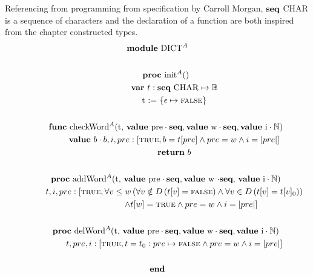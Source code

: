 \documentclass[a4paper,10pt,fleqn]{scrartcl}   	%
\newcommand{\seq}{\pPkey{seq}}
\newcommand{\Module}{\pPkey{module}}
\newcommand{\End}{\pPkey{end}}
\begin{document}
\\ \\
Referencing from programming from specification by Carroll Morgan, $\seq$ CHAR is a sequence of characters and the declaration of a function are both inspired from the chapter constructed types.
\begin{gather*}
\Module \text{ DICT$^A$}\\ \\
\qquad \PROC \text{ init$^A()$}\\
\qquad \qquad \VAR \text{ $t$} : \seq \text{ CHAR} \mapsto \bool \\
\qquad \qquad \text{t := } \{ \epsilon \mapsto \False \} \\ \\
\qquad \FUNC \text{ checkWord$^A$(t, } \VALUE \text{ pre} \cdot{\seq }, \VALUE \text{ w} \cdot{\seq }, \VALUE \text{ i} \cdot{\nat}) \\
\qquad\qquad \VALUE \text{ $b$} \cdot{} b, i, pre:[\True, b=t[pre] \And pre = w \And i=|pre|] \\
\qquad\qquad \RETURN \text{ $b$}\\ \\
\qquad\PROC \text{ addWord$^A$(t, } \VALUE \text{ pre} \cdot{\seq }, \VALUE \text{ w $\cdot{\seq }$, } \VALUE \text{ i} \cdot{\nat}) \\ 
\qquad\qquad t, i, pre:[\True, \All{v \le w}{\All{v \notin D}{t[v]=\False} \And \All{v \in D}{t[v]=t[v]_0}} \\ 
\qquad \qquad \qquad \qquad \And t[w]=\True \And pre=w \And i=|pre|]\\ \\
\qquad\PROC \text{ delWord$^A$(t, } \VALUE \text{ pre} \cdot{\seq }, \VALUE \text{ w} \cdot{\seq }, \VALUE \text{ i} \cdot{\nat}) \\
\qquad\qquad t, pre, i:[\True, t = t_0 : pre \mapsto \False \And pre = w \And i=|pre|] \\ \\
\End \\
\end{gather*}
\end{document}
